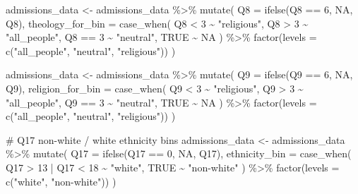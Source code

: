 \documentclass[
  letterpaper,
  DIV=11,
  numbers=noendperiod]{scrartcl}
\newenvironment{Shaded}{\begin{snugshade}}{\end{snugshade}}
\newcommand{\AttributeTok}[1]{\textcolor[rgb]{0.40,0.45,0.13}{#1}}
\newcommand{\CommentTok}[1]{\textcolor[rgb]{0.37,0.37,0.37}{#1}}
\newcommand{\ConstantTok}[1]{\textcolor[rgb]{0.56,0.35,0.01}{#1}}
\newcommand{\DecValTok}[1]{\textcolor[rgb]{0.68,0.00,0.00}{#1}}
\newcommand{\FunctionTok}[1]{\textcolor[rgb]{0.28,0.35,0.67}{#1}}
\newcommand{\NormalTok}[1]{\textcolor[rgb]{0.00,0.23,0.31}{#1}}
\newcommand{\OtherTok}[1]{\textcolor[rgb]{0.00,0.23,0.31}{#1}}
\newcommand{\SpecialCharTok}[1]{\textcolor[rgb]{0.37,0.37,0.37}{#1}}
\newcommand{\StringTok}[1]{\textcolor[rgb]{0.13,0.47,0.30}{#1}}
\begin{document}
\begin{Shaded}
\begin{Highlighting}[]
\NormalTok{admissions\_data }\OtherTok{\textless{}{-}}\NormalTok{ admissions\_data }\SpecialCharTok{\%\textgreater{}\%}
  \FunctionTok{mutate}\NormalTok{(}
    \AttributeTok{Q8 =} \FunctionTok{ifelse}\NormalTok{(Q8 }\SpecialCharTok{==} \DecValTok{6}\NormalTok{, }\ConstantTok{NA}\NormalTok{, Q8),}
    \AttributeTok{theology\_for\_bin =} \FunctionTok{case\_when}\NormalTok{(}
\NormalTok{      Q8 }\SpecialCharTok{\textless{}} \DecValTok{3} \SpecialCharTok{\textasciitilde{}} \StringTok{"religious"}\NormalTok{,}
\NormalTok{      Q8 }\SpecialCharTok{\textgreater{}} \DecValTok{3} \SpecialCharTok{\textasciitilde{}} \StringTok{"all\_people"}\NormalTok{,}
\NormalTok{      Q8 }\SpecialCharTok{==} \DecValTok{3} \SpecialCharTok{\textasciitilde{}} \StringTok{"neutral"}\NormalTok{,}
      \ConstantTok{TRUE} \SpecialCharTok{\textasciitilde{}} \ConstantTok{NA}
\NormalTok{    ) }\SpecialCharTok{\%\textgreater{}\%} \FunctionTok{factor}\NormalTok{(}\AttributeTok{levels =} \FunctionTok{c}\NormalTok{(}\StringTok{"all\_people"}\NormalTok{, }\StringTok{"neutral"}\NormalTok{, }\StringTok{"religious"}\NormalTok{))}
\NormalTok{  )}

\NormalTok{admissions\_data }\OtherTok{\textless{}{-}}\NormalTok{ admissions\_data }\SpecialCharTok{\%\textgreater{}\%}
  \FunctionTok{mutate}\NormalTok{(}
    \AttributeTok{Q9 =} \FunctionTok{ifelse}\NormalTok{(Q9 }\SpecialCharTok{==} \DecValTok{6}\NormalTok{, }\ConstantTok{NA}\NormalTok{, Q9),}
    \AttributeTok{religion\_for\_bin =} \FunctionTok{case\_when}\NormalTok{(}
\NormalTok{      Q9 }\SpecialCharTok{\textless{}} \DecValTok{3} \SpecialCharTok{\textasciitilde{}} \StringTok{"religious"}\NormalTok{,}
\NormalTok{      Q9 }\SpecialCharTok{\textgreater{}} \DecValTok{3} \SpecialCharTok{\textasciitilde{}} \StringTok{"all\_people"}\NormalTok{,}
\NormalTok{      Q9 }\SpecialCharTok{==} \DecValTok{3} \SpecialCharTok{\textasciitilde{}} \StringTok{"neutral"}\NormalTok{,}
      \ConstantTok{TRUE} \SpecialCharTok{\textasciitilde{}} \ConstantTok{NA}
\NormalTok{    ) }\SpecialCharTok{\%\textgreater{}\%} \FunctionTok{factor}\NormalTok{(}\AttributeTok{levels =} \FunctionTok{c}\NormalTok{(}\StringTok{"all\_people"}\NormalTok{, }\StringTok{"neutral"}\NormalTok{, }\StringTok{"religious"}\NormalTok{))}
\NormalTok{  )}

\CommentTok{\# Q17 non{-}white / white ethnicity bins}
\NormalTok{admissions\_data }\OtherTok{\textless{}{-}}\NormalTok{ admissions\_data }\SpecialCharTok{\%\textgreater{}\%}
  \FunctionTok{mutate}\NormalTok{(}
    \AttributeTok{Q17 =} \FunctionTok{ifelse}\NormalTok{(Q17 }\SpecialCharTok{==} \DecValTok{0}\NormalTok{, }\ConstantTok{NA}\NormalTok{, Q17),}
    \AttributeTok{ethnicity\_bin =} \FunctionTok{case\_when}\NormalTok{(}
\NormalTok{      Q17 }\SpecialCharTok{\textgreater{}} \DecValTok{13} \SpecialCharTok{|}\NormalTok{ Q17 }\SpecialCharTok{\textless{}} \DecValTok{18} \SpecialCharTok{\textasciitilde{}} \StringTok{"white"}\NormalTok{,}
      \ConstantTok{TRUE} \SpecialCharTok{\textasciitilde{}} \StringTok{"non{-}white"}
\NormalTok{    ) }\SpecialCharTok{\%\textgreater{}\%} \FunctionTok{factor}\NormalTok{(}\AttributeTok{levels =} \FunctionTok{c}\NormalTok{(}\StringTok{"white"}\NormalTok{, }\StringTok{"non{-}white"}\NormalTok{))}
\NormalTok{  )}


\end{Highlighting}
\end{Shaded}
\end{document}
